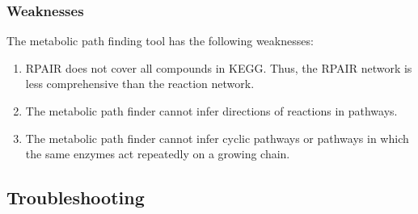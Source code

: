 \subsubsection{Weaknesses}
The metabolic path finding tool has the following weaknesses:

\begin{enumerate}

\item RPAIR does not cover all compounds in KEGG. Thus, the RPAIR network is less comprehensive than the reaction network.

\item The metabolic path finder cannot infer directions of reactions in pathways.

\item The metabolic path finder cannot infer cyclic pathways or pathways in which the same enzymes act repeatedly on a growing chain.

\end{enumerate}


\subsection{Troubleshooting}

